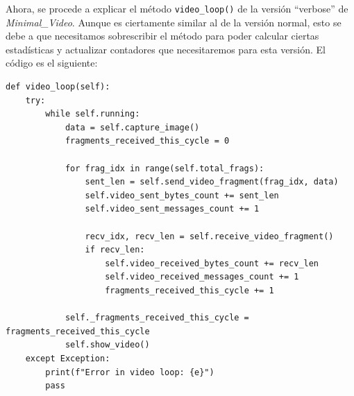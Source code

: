 Ahora, se procede a explicar el método \texttt{video\_loop()} de la versión ``verbose'' de \textit{Minimal\_Video}. Aunque es ciertamente similar al de la versión normal, esto se debe a que necesitamos sobrescribir el método para poder calcular ciertas estadísticas y actualizar contadores que necesitaremos para esta versión. El código es el siguiente:

\begin{lstlisting}[style=pythonstyle, caption={Método \texttt{video\_loop()} de \textit{Minimal\_Video\_verbose}.}, label={lst:video_loop_minimal_video_verbose}]
def video_loop(self):
    try:
        while self.running:
            data = self.capture_image()
            fragments_received_this_cycle = 0

            for frag_idx in range(self.total_frags):
                sent_len = self.send_video_fragment(frag_idx, data)
                self.video_sent_bytes_count += sent_len
                self.video_sent_messages_count += 1

                recv_idx, recv_len = self.receive_video_fragment()
                if recv_len:
                    self.video_received_bytes_count += recv_len
                    self.video_received_messages_count += 1
                    fragments_received_this_cycle += 1

            self._fragments_received_this_cycle = fragments_received_this_cycle
            self.show_video()
    except Exception:
        print(f"Error in video loop: {e}")
        pass
\end{lstlisting}
\vspace{\baselineskip}

